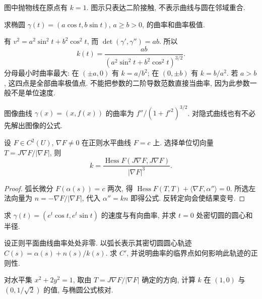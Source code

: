 图中抛物线在原点有 $k=1$. 图示只表达二阶接触, 不表示曲线与圆在邻域重合.
\begin{example}
求椭圆 $\gamma(t)=(a\cos t,b\sin t)$, $a\ge b>0$, 的曲率和曲率极值.
\end{example}
\begin{solution}
有 $v^2=a^2\sin^2t+b^2\cos^2t$, 而 $\det(\gamma',\gamma'')=ab$. 所以
\[
 k(t)=\frac{ab}{(a^2\sin^2t+b^2\cos^2t)^{3/2}}.
\]
分母最小时曲率最大: 在 $(\pm a,0)$ 有 $k=a/b^2$; 在 $(0,\pm b)$ 有 $k=b/a^2$. 若 $a>b$, 这四点是全部曲率极值点. 不能把参数的二阶导数范数直接当曲率, 因为此参数一般不是单位速度.
\end{solution}
图像曲线 $\gamma(x)=(x,f(x))$ 的曲率为 $f''/(1+f'^2)^{3/2}$. 对隐式曲线也有不必先解出图像的公式.
\begin{proposition}
设 $F\in C^2(U)$, $\nabla F\ne0$ 在正则水平曲线 $F=c$ 上. 选择单位切向量 $T=J\nabla F/|\nabla F|$, 则
\[
 k=\frac{\operatorname{Hess}F(J\nabla F,J\nabla F)}{|\nabla F|^3}.
\]
\end{proposition}
\begin{proof}
弧长微分 $F(\alpha(s))=c$ 两次, 得 $\operatorname{Hess}F(T,T)+\langle\nabla F,\alpha''\rangle=0$. 所选左法向量为 $n=-\nabla F/|\nabla F|$, 代入 $\alpha''=kn$ 即得公式. 反转定向会使结果变号.
\end{proof}
\begin{exercise}\label{ex:1a}
求 $\gamma(t)=(e^t\cos t,e^t\sin t)$ 的速度与有向曲率, 并求 $t=0$ 处密切圆的圆心和半径.
\end{exercise}
\begin{exercise}\label{ex:1b}
设正则平面曲线曲率处处非零. 以弧长表示其密切圆圆心轨迹 $C(s)=\alpha(s)+n(s)/k(s)$. 求 $C'$, 并说明曲率的临界点如何影响此轨迹的正则性.
\end{exercise}
\begin{exercise}\label{ex:1c}
对水平集 $x^2+2y^2=1$, 取由 $T=J\nabla F/|\nabla F|$ 确定的方向, 计算 $k$ 在 $(1,0)$ 与 $(0,1/\sqrt2)$ 的值, 与椭圆公式核对.
\end{exercise}
